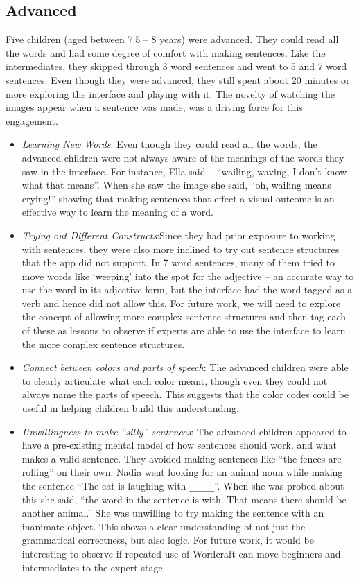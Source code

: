 \documentclass{sigchi-ext}
\begin{document}
\subsection{Advanced}
Five children (aged between 7.5 – 8 years) were advanced. They could read all the words and had some degree of comfort with making sentences. Like the intermediates, they skipped through 3 word sentences and went to 5 and 7 word sentences. Even though they were advanced, they still spent about 20 minutes or more exploring the interface and playing with it. The novelty of watching the images appear when a sentence was made, was a driving force for this engagement.

\begin{itemize}\compresslist
\item 
\emph {Learning New Words}: Even though they could read all the words, the advanced children were not always aware of the meanings of the words they saw in the interface. For instance, Ella said – ``wailing, waving, I don’t know what that means''. When she saw the image she said, ``oh, wailing means crying!'' showing that making sentences that effect a visual outcome is an effective way to learn the meaning of a word.
\item 	
\emph {Trying out Different Constructs}:Since they had prior exposure to working with sentences, they were also more inclined to try out sentence structures that the app did not support. In 7 word sentences, many of them tried to move words like ‘weeping’ into the spot for the adjective – an accurate way to use the word in its adjective form, but the interface had the word tagged as a verb and hence did not allow this. For future work, we will need to explore the concept of allowing more complex sentence structures and then tag each of these as lessons to observe if experts are able to use the interface to learn the more complex sentence structures.
\item 	
\emph {Connect between colors and parts of speech}: The advanced children were able to clearly articulate what each color meant, though even they could not always name the parts of speech. This suggests that the color codes could be useful in helping children build this understanding.
\item 	
\emph {Unwillingness to make ``silly'' sentences}: The advanced children appeared to have a pre-existing mental model of how sentences should work, and what makes a valid sentence. They avoided making sentences like ``the fences are rolling'' on their own. Nadia went looking for an animal noun while making the sentence ``The cat is laughing with \texttt{\_\_\_\_\_}''. When she was probed about this she said, ``the word in the sentence is with. That means there should be another animal.'' She was unwilling to try making the sentence with an inanimate object. This shows a clear understanding of not just the grammatical correctness, but also logic. For future work, it would be interesting to observe if repeated use of Wordcraft can move beginners and intermediates to the expert stage 
\end{itemize}
\end{document}
